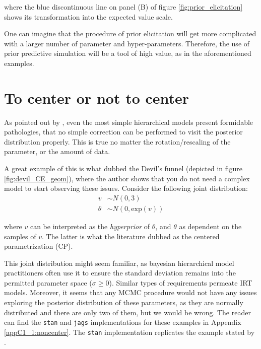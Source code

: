 \noindent where the blue discontinuous line on panel (B) of figure \ref{fig:prior_elicitation} shows its transformation into the expected value scale.

One can imagine that the procedure of prior elicitation will get more complicated with a larger number of parameter and hyper-parameters. Therefore, the use of prior predictive simulation will be a tool of high value, as in the aforementioned examples.




\section{To center or not to center} \label{sect:noncenter}

As pointed out by \citet{Betancourt_et_al_2013}, even the most simple hierarchical models present formidable pathologies, that no simple correction can be performed to visit the posterior distribution properly. This is true no matter the rotation/rescaling of the parameter, or the amount of data. 

A great example of this is what \citet{McElreath_2020} dubbed the Devil's funnel (depicted in figure \ref{fig:devil_CE_geom}), where the author shows that you do not need a complex model to start observing these issues. Consider the following joint distribution:
%
\begin{equation} \label{eq:devil}
	\begin{split}	
		v &\sim N(0, 3) \\
		\theta &\sim N(0, \text{exp}(v))
	\end{split}
\end{equation}

\noindent where $v$ can be interpreted as the \textit{hyperprior} of $\theta$, and $\theta$ as dependent on the samples of $v$. The latter is what the literature dubbed as the centered parametrization (CP).

This joint distribution might seem familiar, as bayesian hierarchical model practitioners often use it to ensure the standard deviation remains into the permitted parameter space ($\sigma \geq 0$). Similar types of requirements permeate IRT models. Moreover, it seems that any MCMC procedure would not have any issues exploring the posterior distribution of these parameters, as they are normally distributed and there are only two of them, but we would be wrong. The reader can find the \texttt{stan} and \texttt{jags} implementations for these examples in Appendix \ref{appC1_1:noncenter}. The \texttt{stan} implementation replicates the example stated by \citet{Betancourt_et_al_2013}.

